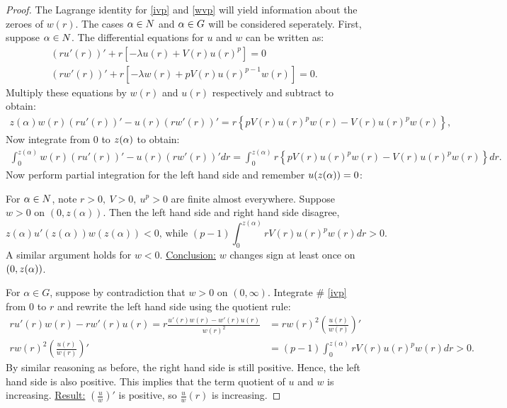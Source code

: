 \begin{proof}
The Lagrange identity for \cref{ivp} and \cref{wvp} will yield information about the zeroes of $w(r)$. The cases $\alpha\in N$ and $\alpha\in G$ will be considered seperately. First, suppose $\alpha\in N$. The differential equations for $u$ and $w$ can be written as:
\begin{gather*}
  (ru'(r))'+r\left[-\lambda u(r)+V(r)u(r)^p\right]=0\\
  (rw'(r))'+r\left[-\lambda w(r)+pV(r)u(r)^{p-1}w(r)\right]=0.
\end{gather*}
Multiply these equations by $w(r)$ and $u(r)$ respectively and subtract to obtain:
\begin{gather*}
	z(\alpha)w(r)(ru'(r))'-u(r)(rw'(r))'=r\left\{pV(r)u(r)^pw(r)-V(r)u(r)^pw(r)\right\},
\end{gather*}
Now integrate from $0$ to $z(\alpha)$ to obtain: 
\begin{gather*}
  \int_0^{z(\alpha)}w(r)(ru'(r))'-u(r)(rw'(r))'dr=
  \int_0^{z(\alpha)}r\left\{pV(r)u(r)^pw(r)-V(r)u(r)^pw(r)\right\}dr.
\end{gather*}
Now perform partial integration for the left hand side and remember $u(z(\alpha))=0$:

For $\alpha\in N$, note $r>0,~V>0,~u^p>0$ are finite almost everywhere. Suppose $w>0$ on $(0,z(\alpha))$. Then the left hand side and right hand side disagree, $$z(\alpha)u'(z(\alpha))w(z(\alpha))<0\text{, while }(p-1)\int_0^{z(\alpha)}rV(r)u(r)^pw(r)dr>0.$$ A similar argument holds for $w<0$. \underline{Conclusion:} $w$ changes sign at least once on $(0,z(\alpha))$.

For $\alpha\in G$, suppose by contradiction that $w>0$ on $(0,\infty)$.
Integrate \# \cref{ivp} from $0$ to $r$ and rewrite the left hand side using the quotient rule:
\begin{align*}
ru'(r)w(r)-rw'(r)u(r)
=r\frac{u'(r)w(r)-w'(r)u(r)}{w(r)^2}
&=rw(r)^2\left(\frac{u(r)}{w(r)}\right)'\\
rw(r)^2\left(\frac{u(r)}{w(r)}\right)'
&=(p-1)\int_0^{z(\alpha)}rV(r)u(r)^pw(r)dr>0.
\end{align*}
By similar reasoning as before, the right hand side is still positive. Hence, the left hand side is also positive. This implies that the term quotient of $u$ and $w$ is increasing.
\underline{Result:} $\left(\frac{u}{w}\right)'$ is positive, so $\frac{u}{w}(r)$ is increasing.


\end{proof}
